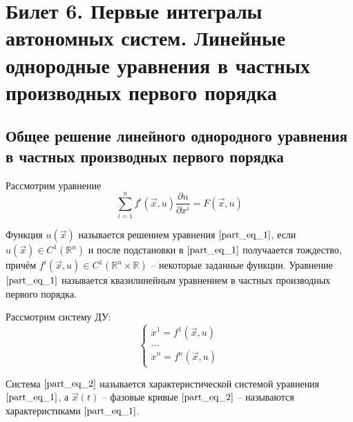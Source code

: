 \documentclass[a4paper, 12pt]{article}
\begin{document}
    \section{Билет 6. Первые интегралы автономных систем. Линейные однородные уравнения в частных производных первого порядка}
    \subsection{Общее решение линейного однородного уравнения в частных производных первого порядка}

    \begin{definition}
        Рассмотрим уравнение 
        \begin{equation}
            \sum \limits_{i = 1}^{n} f^{i} \left( \overrightarrow{x}, u \right) \frac{\partial u}{\partial x^{i}} = F \left( \overrightarrow{x}, u \right)
            \label{part_eq_1}
        \end{equation}

        Функция $u \left( \overrightarrow{x} \right)$ называется решением уравнения $\eqref{part_eq_1}$, если $u \left( \overrightarrow{x} \right) \in C^{1} \left( \mathbb{R}^n \right)$ и после подстановки в $\eqref{part_eq_1}$ получаается тождество, причём $f^{i} \left( \overrightarrow{x}, u \right) \in C^{1} \left( \mathbb{R}^n \times \mathbb{R} \right)$ -- некоторые заданные функции. Уравнение $\eqref{part_eq_1}$ называется квазилинейным уравнением в частных производных первого порядка. 
    \end{definition}
    
    \begin{definition}
        Рассмотрим систему ДУ:
        \begin{equation}
            \begin{cases}
                \dot{x}^1 = f^1 \left( \overrightarrow{x}, u \right) \\
                \dots                                                \\
                \dot{x}^n = f^n \left( \overrightarrow{x}, u \right)
            \end{cases}
            \label{part_eq_2}
        \end{equation}
    
        Система $\eqref{part_eq_2}$ называется характеристической системой уравнения $\eqref{part_eq_1}$, а $\overrightarrow{x} \left( t \right) $ -- фазовые кривые $\eqref{part_eq_2}$ -- называются характеристиками $\eqref{part_eq_1}$.
    \end{definition}
   
\end{document}
